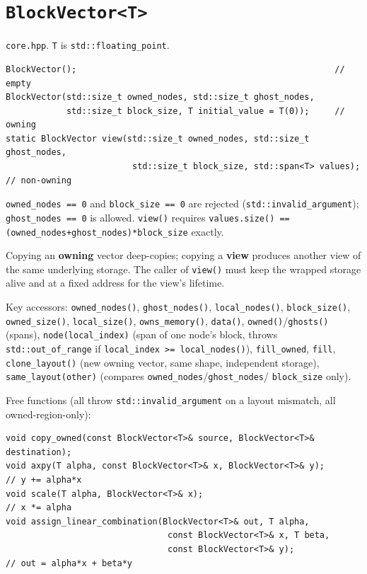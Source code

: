 \documentclass[11pt,a4paper]{report}
\begin{document}
\section{\texorpdfstring{\lstinline!BlockVector<T>!}{BlockVector<T>}}
\label{sec:3.2}

\texttt{core.hpp}. \texttt{T} is \lstinline!std::floating_point!.

\begin{lstlisting}
BlockVector();                                                   // empty
BlockVector(std::size_t owned_nodes, std::size_t ghost_nodes,
            std::size_t block_size, T initial_value = T(0));     // owning
static BlockVector view(std::size_t owned_nodes, std::size_t ghost_nodes,
                         std::size_t block_size, std::span<T> values); // non-owning
\end{lstlisting}

\lstinline!owned_nodes == 0! and \lstinline!block_size == 0! are rejected
(\lstinline!std::invalid_argument!); \lstinline!ghost_nodes == 0! is allowed.
\lstinline!view()! requires \lstinline!values.size() == (owned_nodes+ghost_nodes)*block_size!
exactly.

Copying an \textbf{owning} vector deep-copies; copying a \textbf{view}
produces another view of the same underlying storage. The caller of
\lstinline!view()! must keep the wrapped storage alive and at a fixed address
for the view's lifetime.

Key accessors: \lstinline!owned_nodes()!, \lstinline!ghost_nodes()!, \lstinline!local_nodes()!,
\lstinline!block_size()!, \lstinline!owned_size()!, \lstinline!local_size()!, \lstinline!owns_memory()!,
\lstinline!data()!, \lstinline!owned()!/\lstinline!ghosts()! (spans), \lstinline!node(local_index)! (span
of one node's block, throws \lstinline!std::out_of_range! if
\lstinline!local_index >= local_nodes()!), \lstinline!fill_owned!, \lstinline!fill!,
\lstinline!clone_layout()! (new owning vector, same shape, independent
storage), \lstinline!same_layout(other)! (compares \lstinline!owned_nodes!/\lstinline!ghost_nodes!/
\lstinline!block_size! only).

Free functions (all throw \lstinline!std::invalid_argument! on a layout
mismatch, all owned-region-only):

\begin{lstlisting}
void copy_owned(const BlockVector<T>& source, BlockVector<T>& destination);
void axpy(T alpha, const BlockVector<T>& x, BlockVector<T>& y);           // y += alpha*x
void scale(T alpha, BlockVector<T>& x);                                  // x *= alpha
void assign_linear_combination(BlockVector<T>& out, T alpha,
                                const BlockVector<T>& x, T beta,
                                const BlockVector<T>& y);                 // out = alpha*x + beta*y
\end{lstlisting}
\end{document}
